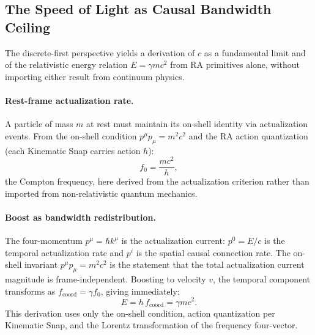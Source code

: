 \documentclass[11pt,a4paper]{article}
\theoremstyle{plain}
\theoremstyle{definition}
\theoremstyle{remark}
\begin{document}
\subsection{The Speed of Light as Causal Bandwidth Ceiling}
\label{subsec:bandwidth}

The discrete-first perspective yields a derivation of $c$ as a fundamental
limit and of the relativistic energy relation $E = \gamma mc^2$ from RA
primitives alone, without importing either result from continuum physics.

\paragraph{Rest-frame actualization rate.}
A particle of mass $m$ at rest must maintain its on-shell identity via
actualization events. From the on-shell condition $p^\mu p_\mu = m^2c^2$
and the RA action quantization (each Kinematic Snap carries action $h$):
\begin{equation}
  f_0 = \frac{mc^2}{h},
  \label{eq:rest_freq}
\end{equation}
the Compton frequency, here derived from the actualization criterion rather
than imported from non-relativistic quantum mechanics.

\paragraph{Boost as bandwidth redistribution.}
The four-momentum $p^\mu = \hbar k^\mu$ is the actualization current:
$p^0 = E/c$ is the temporal actualization rate and $p^i$ is the spatial
causal connection rate. The on-shell invariant $p^\mu p_\mu = m^2c^2$ is
the statement that the total actualization current magnitude is frame-independent.
Boosting to velocity $v$, the temporal component transforms as
$f_{\mathrm{coord}} = \gamma f_0$, giving immediately:
\begin{equation}
  E = h\,f_{\mathrm{coord}} = \gamma m c^2.
  \label{eq:rel_energy_derived}
\end{equation}
This derivation uses only the on-shell condition, action quantization per
Kinematic Snap, and the Lorentz transformation of the frequency four-vector.
\end{document}
